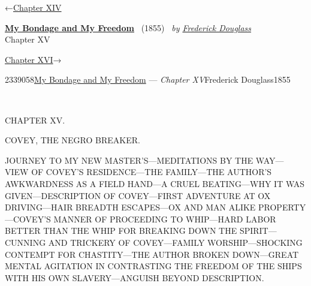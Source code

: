 \hypertarget{headerContainer}{}
\hypertarget{navigationHeader}{}
\protect\hypertarget{headerprevious}{}{←\href{/wiki/My_Bondage_and_My_Freedom_(1855)/Chapter_XIV}{Chapter
XIV}}

\textbf{\protect\hypertarget{header_title_text}{}{\href{/wiki/My_Bondage_and_My_Freedom_(1855)}{My
Bondage and My Freedom}}} ~(1855)~ \emph{by
\href{/wiki/Author:Frederick_Douglass}{\protect\hypertarget{header_author_text}{}{{Frederick
Douglass}}}}\\
\protect\hypertarget{header_section_text}{}{Chapter XV}

\protect\hypertarget{headernext}{}{\href{/wiki/My_Bondage_and_My_Freedom_(1855)/Chapter_XVI}{Chapter
XVI}→}

\hypertarget{navigationNotes}{}

\hypertarget{ws-data}{}
\protect\hypertarget{ws-article-id}{}{2339058}\protect\hypertarget{ws-title}{}{\href{/wiki/My_Bondage_and_My_Freedom_(1855)}{My
Bondage and My Freedom} --- \emph{Chapter
XV}}\protect\hypertarget{ws-author}{}{Frederick
Douglass}\protect\hypertarget{ws-year}{}{1855}

{\protect\hypertarget{205}{}{}}

~

{CHAPTER XV.}

COVEY, THE NEGRO BREAKER.

{JOURNEY TO MY NEW MASTER'S---MEDITATIONS BY THE WAY---VIEW OF COVEY'S
RESIDENCE---THE FAMILY---THE AUTHOR'S AWKWARDNESS AS A FIELD HAND---A
CRUEL BEATING---WHY IT WAS GIVEN---DESCRIPTION OF COVEY---FIRST
ADVENTURE AT OX DRIVING---HAIR BREADTH ESCAPES---OX AND MAN ALIKE
PROPERTY---COVEY'S MANNER OF PROCEEDING TO WHIP---HARD LABOR BETTER THAN
THE WHIP FOR BREAKING DOWN THE SPIRIT---CUNNING AND TRICKERY OF
COVEY---FAMILY WORSHIP---SHOCKING CONTEMPT FOR CHASTITY---THE AUTHOR
BROKEN DOWN---GREAT MENTAL AGITATION IN CONTRASTING THE FREEDOM OF THE
SHIPS WITH HIS OWN SLAVERY---ANGUISH BEYOND DESCRIPTION.}


